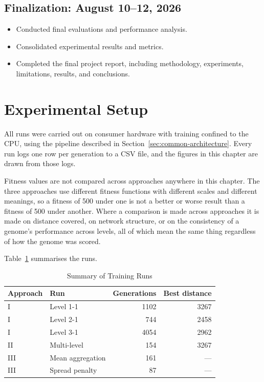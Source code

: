 \subsection{Finalization: August 10--12, 2026}

\begin{itemize}
    \item Conducted final evaluations and performance analysis.
    \item Consolidated experimental results and metrics.
    \item Completed the final project report, including methodology,
    experiments, limitations, results, and conclusions.
\end{itemize}

\section{Experimental Setup}
\label{sec:experimental-setup}

All runs were carried out on consumer hardware with training confined to the
CPU, using the pipeline described in
Section~\ref{sec:common-architecture}. Every run logs one row per generation to
a CSV file, and the figures in this chapter are drawn from those logs.

\noindent
Fitness values are not compared across approaches anywhere in this chapter. The
three approaches use different fitness functions with different scales and
different meanings, so a fitness of 500 under one is not a better or worse
result than a fitness of 500 under another. Where a comparison is made across
approaches it is made on distance covered, on network structure, or on the
consistency of a genome's performance across levels, all of which mean the same
thing regardless of how the genome was scored.

\noindent
Table~\ref{tab:run-summary} summarises the runs.

\begin{table}[H]
\centering
\caption{Summary of Training Runs}
\label{tab:run-summary}
\small
\begin{tabular}{@{}llrr@{}}
\toprule
\textbf{Approach} & \textbf{Run} & \textbf{Generations} & \textbf{Best distance} \\
\midrule
I   & Level 1-1        & 1102 & 3267 \\
I   & Level 2-1        &  744 & 2458 \\
I   & Level 3-1        & 4054 & 2962 \\
\addlinespace
II  & Multi-level      &  154 & 3267 \\
\addlinespace
III & Mean aggregation &  161 & --- \\
III & Spread penalty   &   87 & --- \\
\bottomrule
\end{tabular}
\end{table}

